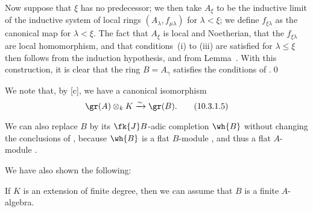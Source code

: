 \begin{env}[10.3.1.4]
Now suppose that $\xi$ has no predecessor;
we then take $A_\xi$ to be the inductive limit of the inductive system of local rings $(A_\lambda,f_{\mu\lambda})$ for $\lambda<\xi$;
we define $f_{\xi\lambda}$ as the canonical map for $\lambda<\xi$.
The fact that $A_\xi$ is local and Noetherian, that the $f_{\xi\lambda}$ are local homomorphism, and that conditions~(i) to (iii) are satisfied for $\lambda\leq\xi$
then follows from the induction hypothesis, and from Lemma~.
With this construction, it is clear that the ring $B=A_\gamma$ satisfies the conditions of .\qed
\end{env}

We note that, by [c], we have a canonical isomorphism
\begin{equation*}
\label{0.10.3.1.5}
    \gr(A)\otimes_k K\xrightarrow{\sim}\gr(B).\tag{10.3.1.5}
\end{equation*}

We can also replace $B$ by its $\fk{J}B$-adic completion $\wh{B}$ without changing the conclusions of , because $\wh{B}$ is a flat $B$-module , and thus a flat $A$-module .

We have also shown the following:
\begin{cor}[10.3.2]
\label{0.10.3.2}
If $K$ is an extension of finite degree, then we can assume that $B$ is a finite $A$-algebra.
\end{cor}

